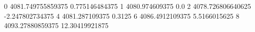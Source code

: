 0 4081.749755859375 0.775146484375
1 4080.974609375 0.0
2 4078.726806640625 -2.247802734375
4 4081.287109375 0.3125
6 4086.4912109375 5.5166015625
8 4093.27880859375 12.30419921875
